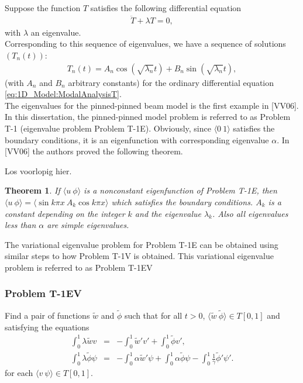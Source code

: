 \documentclass[../../main.tex]{subfiles}
\begin{document}
Suppose the function $T$ satisfies the following differential equation
\begin{eqnarray}
	\ddot{T} + \lambda T = 0, \label{eq:1D_Model:ModalAnalysisT}
\end{eqnarray} with $\lambda$ an eigenvalue.\\

Corresponding to this sequence of eigenvalues, we have a sequence of solutions $(T_n(t))$:
\begin{eqnarray}
	T_n(t)=A_n\cos(\sqrt{\lambda_n}t)+B_n\sin(\sqrt{\lambda_n}t), \label{eq:1D_Model:ModalAnalysisTn}
\end{eqnarray}
(with $A_n$ and $B_n$ arbitrary constants) for the ordinary differential equation \eqref{eq:1D_Model:ModalAnalysisT}.\\

The eigenvalues for the pinned-pinned beam model is the first example in [VV06]. In this dissertation, the pinned-pinned model problem is referred to as Problem T-1 (eigenvalue problem Problem T-1E). Obviously, since $\langle 0 \ 1\rangle$ satisfies the boundary conditions, it is an eigenfunction with corresponding eigenvalue $\alpha$. In [VV06] the authors proved the following theorem.


Los voorlopig hier.\\

\newtheorem{ThmVV06}{Theorem}
\begin{ThmVV06}
	If $\langle u \ \phi\rangle$ is a nonconstant eigenfunction of Problem T-1E, then $\langle u \ \phi\rangle = \langle\sin k \pi x \ A_k \cos k \pi x\rangle$ which satisfies the boundary conditions. $A_k$ is a constant depending on the integer $k$ and the eigenvalue $\lambda_k$. Also all eigenvalues less than $\alpha$ are simple eigenvalues.
\end{ThmVV06}



The variational eigenvalue problem for Problem T-1E can be obtained using similar steps to how Problem T-1V is obtained. This variational eigenvalue problem is referred to as Problem T-1EV

\subsubsection*{Problem T-1EV}\label{sssec:1D_Model:ProblemT1EV}
Find a pair of functions $\tilde{w}$ and $\tilde{\phi}$ such that for all $t >0$, $\langle \tilde{w}\ \tilde{\phi}\rangle \in  T[0,1]$ and satisfying the equations
\begin{eqnarray*}
	\int_0^1 \lambda \tilde{w} v &=& -\int_0^1 \tilde{w}'v'  + \int_0^1 \tilde{\phi} v',\\
	\int_0^1 \lambda \tilde{\phi} \psi &=& -\int_0^1\alpha \tilde{w}' \psi + \int_0^1\alpha \tilde{\phi} \psi - \int_0^1\frac{1}{\gamma}\tilde{\phi}' \psi'.
\end{eqnarray*} for each $\langle v \ \psi\rangle \in T[0,1]$.\\
\end{document}
